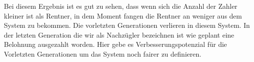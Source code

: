 \begin{table}[hbt!]
\centering
{}
\end{table}

Bei diesem Ergebnis ist es gut zu sehen, dass wenn sich die Anzahl der Zahler kleiner ist als Rentner, in dem Moment fangen die Rentner an weniger aus dem System zu bekommen. Die vorletzten Generationen verlieren in diesem System. In der letzten Generation die wir als Nachzügler bezeichnen ist wie geplant eine Belohnung ausgezahlt worden. Hier gebe es Verbesserungspotenzial für die Vorletzten Generationen um das System noch fairer zu definieren.

